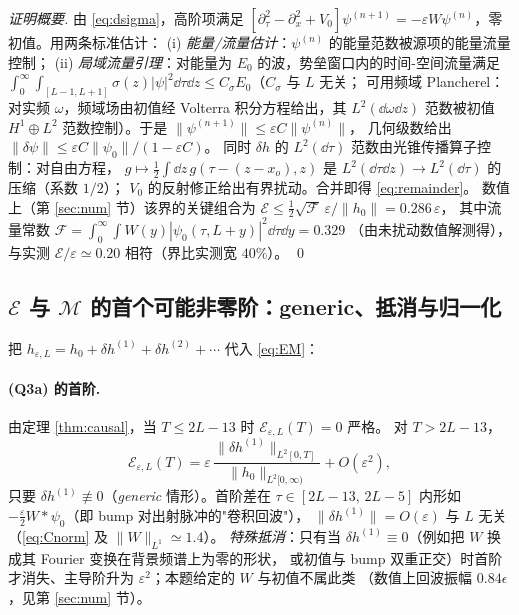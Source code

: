 \begin{proof}[证明概要]
由 \eqref{eq:dsigma}，高阶项满足
$[\partial_\tau^2-\partial_x^2+V_0]\psi^{(n+1)}=-\varepsilon W\psi^{(n)}$，零初值。用两条标准估计：
(i) \emph{能量/流量估计}：$\psi^{(n)}$ 的能量范数被源项的能量流量控制；
(ii) \emph{局域流量引理}：对能量为 $E_0$ 的波，势垒窗口内的时间-空间流量满足
$\int_0^\infty\!\!\int_{[L-1,L+1]}\!\!\sigma(z)|\psi|^2\dd\tau\dd z\le C_\sigma E_0$（$C_\sigma$ 与 $L$ 无关；
可用频域 Plancherel：对实频 $\omega$，频域场由初值经 Volterra 积分方程给出，其 $L^2(\dd\omega\dd z)$
范数被初值 $H^1\oplus L^2$ 范数控制）。于是 $\|\psi^{(n+1)}\|\le\varepsilon C\|\psi^{(n)}\|$，
几何级数给出 $\|\delta\psi\|\le \varepsilon C\|\psi_0\|/(1-\varepsilon C)$。
同时 $\delta h$ 的 $L^2(\dd\tau)$ 范数由光锥传播算子控制：对自由方程，
$g\mapsto \frac12\!\int\!\dd z\,g(\tau-(z-x_o),z)$ 是 $L^2(\dd\tau\dd z)\to L^2(\dd\tau)$ 的压缩（系数 $1/2$）；
$V_0$ 的反射修正给出有界扰动。合并即得 \eqref{eq:remainder}。
数值上（第 \ref{sec:num} 节）该界的关键组合为
$\mathcal E\le \frac12\sqrt{\mathcal F}\,\varepsilon/\|h_0\|=0.286\,\varepsilon$，
其中流量常数 $\mathcal F=\int_0^\infty\!\!\int W(y)|\psi_0(\tau,L+y)|^2\dd\tau\dd y=0.329$
（由未扰动数值解测得），与实测 $\mathcal E/\varepsilon\simeq0.20$ 相符（界比实测宽 $40\%$）。
\qed
\end{proof}

\subsection{$\mathcal E$ 与 $\mathcal M$ 的首个可能非零阶：generic、抵消与归一化}

把 $h_{\varepsilon,L}=h_0+\delta h^{(1)}+\delta h^{(2)}+\cdots$ 代入 \eqref{eq:EM}：

\paragraph{(Q3a) 的首阶.}
由定理 \ref{thm:causal}，当 $T\le2L-13$ 时 $\mathcal E_{\varepsilon,L}(T)=0$ 严格。
对 $T>2L-13$，
\begin{equation}
\mathcal E_{\varepsilon,L}(T)=\varepsilon\,
\frac{\|\delta h^{(1)}\|_{L^2[0,T]}}{\|h_0\|_{L^2[0,\infty)}}+O(\varepsilon^2),
\label{eq:Efirst}
\end{equation}
只要 $\delta h^{(1)}\not\equiv0$（\emph{generic} 情形）。首阶差在 $\tau\in[2L-13,\,2L-5]$ 内形如
$-\frac{\varepsilon}{2}W*\psi_0$（即 bump 对出射脉冲的"卷积回波"），
$\|\delta h^{(1)}\|=O(\varepsilon)$ 与 $L$ 无关（\eqref{eq:Cnorm} 及 $\|W\|_{L^1}\simeq1.4$）。
\emph{特殊抵消}：只有当 $\delta h^{(1)}\equiv0$（例如把 $W$ 换成其 Fourier 变换在背景频谱上为零的形状，
或初值与 bump 双重正交）时首阶才消失、主导阶升为 $\varepsilon^2$；本题给定的 $W$ 与初值不属此类
（数值上回波振幅 $0.84\epsilon$，见第 \ref{sec:num} 节）。

